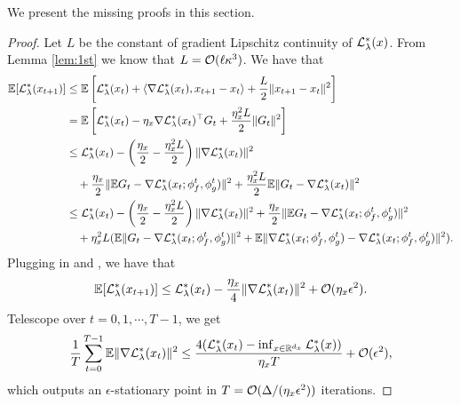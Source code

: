 {We present the missing proofs in this section. 

\thmouter* 
\begin{proof} Let $L$ be the constant of gradient Lipschitz continuity of ${\mathcal{L}}_{\lambda}^*(x)$. From 
Lemma \ref{lem:1st} we know that $L = {\mathcal{O}}(\ell \kappa^3)$. We have that
    \begin{align*}
    {\mathbb{E}}[ {\mathcal{L}}_{\lambda}^*(x_{t+1})] &\le {\mathbb{E}} \left[{\mathcal{L}}_{\lambda}^*(x_t) + \langle \nabla {\mathcal{L}}_{\lambda}^*(x_t) , x_{t+1} - x_t
    \rangle + \frac{L}{2} \Vert x_{t+1 } - x_t \Vert^2 \right] \\
    &= {\mathbb{E}} \left[ {\mathcal{L}}_{\lambda}^*(x_t) -
    \eta_x \nabla {\mathcal{L}}_{\lambda}^*(x_t)^\top G_t + \frac{\eta_x^2 L}{2} \Vert G_t \Vert^2 \right] \\
    &\le {\mathcal{L}}_{\lambda}^*(x_t) - \left( \frac{\eta_x}{2} - \frac{\eta_x^2 L}{2} \right) \Vert \nabla {\mathcal{L}}_{\lambda}^*(x_t) \Vert^2  \\
    &\quad + \frac{\eta_x}{2} \Vert {\mathbb{E}} G_t -  \nabla {\mathcal{L}}_{\lambda}^*(x_t; \phi_f^t, \phi_g^t )  \Vert^2 + \frac{\eta_x^2 L}{2} {\mathbb{E}} \Vert G_t -  \nabla {\mathcal{L}}_{\lambda}^*(x_t)  \Vert^2 \\
    &\le {\mathcal{L}}_{\lambda}^*(x_t) - \left( \frac{\eta_x}{2} - \frac{\eta_x^2 L}{2} \right) \Vert \nabla {\mathcal{L}}_{\lambda}^*(x_t) \Vert^2 + \frac{\eta_x}{2} \Vert {\mathbb{E}} G_t -  \nabla {\mathcal{L}}_{\lambda}^*(x_t; \phi_f^t, \phi_g^t )  \Vert^2 \\
    &\quad  + \eta_x^2 L ( {\mathbb{E}} \Vert G_t -  \nabla {\mathcal{L}}_{\lambda}^*(x_t; \phi_f^t, \phi_g^t)  \Vert^2 + {\mathbb{E}} \Vert \nabla {\mathcal{L}}_{\lambda}^*(x_t; \phi_f^t, \phi_g^t) - \nabla {\mathcal{L}}_{\lambda}^*(x_t; \phi_f^t, \phi_g^t) \Vert^2 ).
    \end{align*}
    Plugging in  and , we have that
\begin{align*}
     {\mathbb{E}}[ {\mathcal{L}}_{\lambda}^*(x_{t+1})] \le {\mathcal{L}}_{\lambda}^*(x_t) - \frac{\eta_x}{4} \Vert \nabla {\mathcal{L}}_{\lambda}^*(x_t) \Vert^2  + {\mathcal{O}}(\eta_x \epsilon^2).
\end{align*}
Telescope over $t =0,1,\cdots,T-1$, we get
\begin{align} \label{eq:final-fosp}
    \frac{1}{T} \sum_{t=0}^{T-1} {\mathbb{E}} \Vert \nabla {\mathcal{L}}_{\lambda}^*(x_t) \Vert^2 \le \frac{4 ({\mathcal{L}}_{\lambda}^*(x_t) - \inf_{x \in {\mathbb{R}}^{d_x}} {\mathcal{L}}_{\lambda}^*(x))}{ \eta_x T} + {\mathcal{O}}(\epsilon^2),
\end{align}
which outputs an $\epsilon$-stationary point in $T = {\mathcal{O}}( \Delta / (\eta_x \epsilon^2) )$ iterations.
\end{proof} 

}
